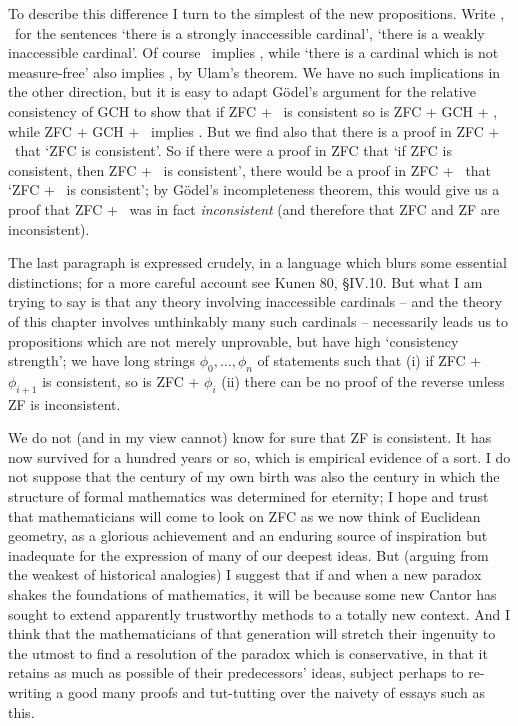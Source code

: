 {To describe this difference I turn to the simplest of the new
propositions.   Write \Esic, \Ewic\ for the sentences `there is a
strongly inaccessible cardinal', `there is a weakly inaccessible
cardinal'.   Of course \Esic\ implies \Ewic, while `there is a cardinal
which is not measure-free' also implies \Ewic, by Ulam's theorem.   We
have no such implications in the other direction, but it is easy to
adapt G\"odel's argument for the relative consistency of GCH to show
that if ZFC + \Ewic\ is consistent so is ZFC + GCH + \Ewic, while
ZFC + GCH + \Ewic\ implies \Esic.   But we find also that there is a
proof in ZFC + \Esic\ that `ZFC is consistent'.   So if there were a
proof in ZFC that
`if ZFC is consistent, then ZFC + \Esic\ is consistent', there would be
a proof in ZFC + \Esic\ that `ZFC + \Esic\ is consistent';  by G\"odel's
incompleteness theorem, this would give us a proof that ZFC + \Esic\ was
in fact {\it inconsistent} (and therefore that ZFC and ZF are
inconsistent).

The last paragraph is expressed crudely, in a language which blurs some
essential distinctions;  for a more careful account see {\smc Kunen 80},
{\S}IV.10.   But what I am trying to say is that any theory involving
inaccessible cardinals -- and the theory of this chapter involves
unthinkably many such cardinals -- necessarily leads us to propositions
which are not merely unprovable, but have high `consistency strength';
we have long strings $\phi_0,\ldots,\phi_n$ of statements such that (i)
if ZFC + $\phi_{i+1}$ is consistent, so is ZFC + $\phi_i$ (ii) there can
be no proof of the reverse unless ZF is inconsistent.

We do not (and in my view cannot) know for sure that ZF is consistent.
It has now survived for a hundred years or so, which is empirical
evidence of a sort.   I do not suppose that the century of my own birth
was also the century in which the structure of formal mathematics was
determined for eternity;  I hope and trust that mathematicians will come
to look on ZFC as we now think of Euclidean geometry, as a glorious
achievement and an enduring source of inspiration but inadequate for the
expression of many of our deepest ideas.   But (arguing from the weakest
of historical analogies) I suggest that if and when a new paradox shakes
the foundations of mathematics, it will be because some new Cantor has
sought to extend apparently trustworthy methods to a totally new
context.   And I think that the mathematicians of that generation will
stretch their ingenuity to the utmost to find a resolution of the
paradox which is conservative, in that it retains as much as possible of
their predecessors' ideas, subject perhaps to re-writing a good many
proofs and tut-tutting over the naivety of essays such as this.

}
